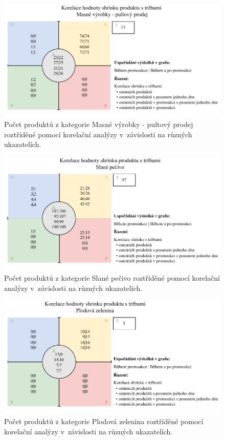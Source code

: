 \begin{figure}[h!]
    \centering
    \captionsetup{justification=centering}
    \includegraphics[width=\textwidth]{obrazky/korelace-maso.pdf}
    \caption{Počet produktů z kategorie Masné výrobky - pultový prodej roztříděné pomocí korelační analýzy v~závislosti na různých ukazatelích.}
    \label{obr:kategCorrPorovnani}
\end{figure}

\begin{figure}[h!]
    \centering
    \captionsetup{justification=centering}
    \includegraphics[width=\textwidth]{obrazky/korelace-pecivo.pdf}
    \caption{Počet produktů z kategorie Slané pečivo roztříděné pomocí korelační analýzy v~závislosti na různých ukazatelích.}
    \label{obr:kategCorrPorovnaniPec}
\end{figure}

\begin{figure}[h!]
    \centering
    \captionsetup{justification=centering}
    \includegraphics[width=\textwidth]{obrazky/korelace-zel.pdf}
    \caption{Počet produktů z kategorie Plodová zelenina roztříděné pomocí korelační analýzy v~závislosti na různých ukazatelích.}
    \label{obr:kategCorrPorovnaniZel}
\end{figure}

